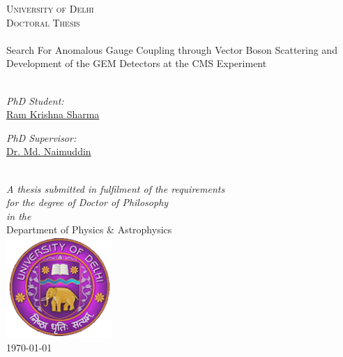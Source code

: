 \begin{titlepage}
\begin{center}

\textsc{\LARGE \color{red!50!black}University of Delhi}\\[1.1cm] %
\textsc{\Large Doctoral Thesis}\\[0.5cm] %

\HRule \\[0.4cm] %
{\huge {}\selectfont Search For Anomalous Gauge Coupling through Vector Boson Scattering and Development of the GEM Detectors at the CMS Experiment}\\[0.4cm] %
\HRule \\[1.5cm] %
 
\begin{minipage}{0.4\textwidth}
\begin{flushleft} \large
\emph{PhD Student:}\\
\href{https://ram1123.github.io/about/}{\color{red!50!black}Ram Krishna Sharma} %
\end{flushleft}
\end{minipage}
\begin{minipage}{0.4\textwidth}
\begin{flushright} \large
\emph{PhD Supervisor:} \\
\href{http://www.du.ac.in/du/uploads/Faculty%20Profiles/2017/Physics/Dec2016_Physics_Naimuddin.pdf}{\color{red!50!black}Dr. Md. Naimuddin} %
\end{flushright}
\end{minipage}\\[2.0cm]
 
\large \textit{A thesis submitted in fulfilment of the requirements\\ for the degree of Doctor of Philosophy}\\[0.3cm] %
\textit{in the}\\[0.3cm]

{\color{red!50!black}Department of Physics \& Astrophysics}\\[0.3cm] %
 
\includegraphics[width=4cm]{figures/logo_du.jpg}\\
{\large \monthyeardate\today}\\ %
 
\vfill
\end{center}

\end{titlepage}